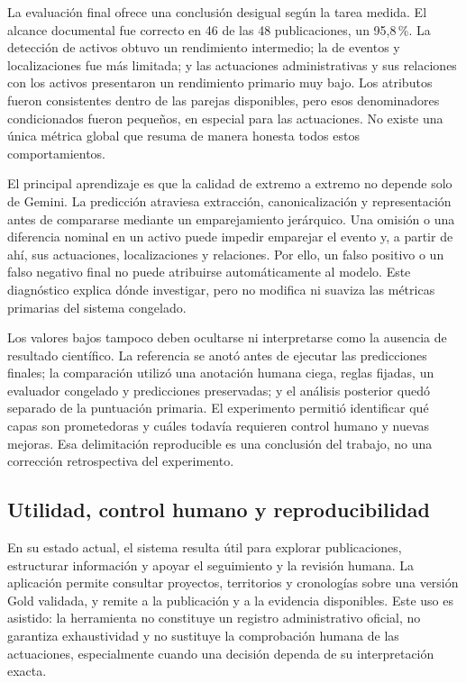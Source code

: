 La evaluación final ofrece una conclusión desigual según la tarea medida. El
alcance documental fue correcto en 46 de las 48 publicaciones, un 95,8\,\%.
La detección de activos obtuvo un rendimiento intermedio; la de eventos y
localizaciones fue más limitada; y las actuaciones administrativas y sus
relaciones con los activos presentaron un rendimiento primario muy bajo. Los
atributos fueron consistentes dentro de las parejas disponibles, pero esos
denominadores condicionados fueron pequeños, en especial para las actuaciones.
No existe una única métrica global que resuma de manera honesta todos estos
comportamientos.

El principal aprendizaje es que la calidad de extremo a extremo no depende solo
de Gemini. La predicción atraviesa extracción, canonicalización y
representación antes de compararse mediante un emparejamiento jerárquico. Una
omisión o una diferencia nominal en un activo puede impedir emparejar el
evento y, a partir de ahí, sus actuaciones, localizaciones y relaciones. Por
ello, un falso positivo o un falso negativo final no puede atribuirse
automáticamente al modelo. Este diagnóstico explica dónde investigar, pero no
modifica ni suaviza las métricas primarias del sistema congelado.

Los valores bajos tampoco deben ocultarse ni interpretarse como la ausencia de
resultado científico. La referencia se anotó antes de ejecutar las
predicciones finales; la comparación utilizó una anotación humana ciega,
reglas fijadas, un evaluador congelado y predicciones preservadas; y el análisis
posterior quedó separado de la puntuación primaria. El experimento permitió
identificar qué capas son prometedoras y cuáles todavía requieren control
humano y nuevas mejoras. Esa delimitación reproducible es una conclusión del
trabajo, no una corrección retrospectiva del experimento.

\subsection{Utilidad, control humano y reproducibilidad}

En su estado actual, el sistema resulta útil para explorar publicaciones,
estructurar información y apoyar el seguimiento y la revisión humana. La
aplicación permite consultar proyectos, territorios y cronologías sobre una
versión Gold validada, y remite a la publicación y a la evidencia disponibles.
Este uso es asistido: la herramienta no constituye un registro administrativo
oficial, no garantiza exhaustividad y no sustituye la comprobación humana de
las actuaciones, especialmente cuando una decisión dependa de su
interpretación exacta.

